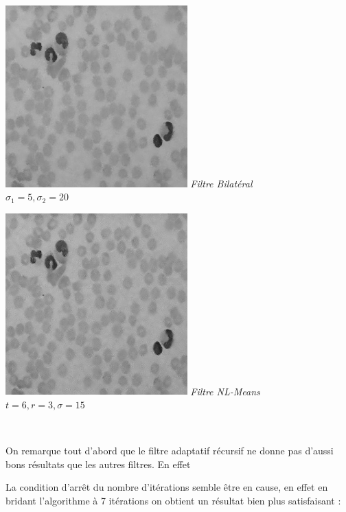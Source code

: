 \documentclass[a4,12pt]{article}
\begin{document}
\begin{center}
\begin{minipage}[c]{0.45\linewidth}
		\begin{center}
			\includegraphics[width = 70mm]{./img/globb25Bilateral_5_20.jpg}
			\textit{Filtre Bilatéral}\\
			\textit{$\sigma_1 =5 , \sigma_2=20$}\\
		\end{center}
	\end{minipage}
	\begin{minipage}[c]{0.45\linewidth}
		\begin{center}
			\includegraphics[width = 70mm]{./img/globNLMeans.jpg}
			\textit{Filtre NL-Means}\\
			\textit{$t = 6, r= 3, \sigma=15$}\\
		\end{center}
	\end{minipage}\\
\end{center}


On remarque tout d'abord que le filtre adaptatif récursif ne donne pas d'aussi bons résultats que les autres filtres. En effet 

La condition d'arrêt du nombre d'itérations semble être en cause, en effet en bridant l'algorithme à 7 itérations on obtient un résultat bien plus satisfaisant :\\
\end{document}
